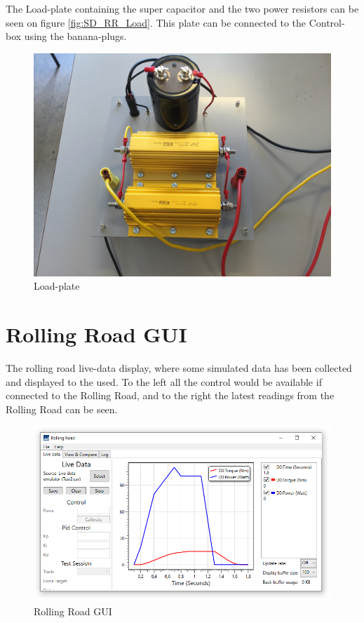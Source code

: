 The Load-plate containing the super capacitor and the two power resistors can be seen on figure \vref{fig:SD_RR_Load}. This plate can be connected to the Control-box using the banana-plugs.

\begin{figure}[H]
	\centering
	\includegraphics[width=0.7\linewidth]{SubPages/Images/SD_RR_Load}
	\caption{Load-plate}
	\label{fig:SD_RR_Load}
\end{figure}

\newpage
\section{Rolling Road GUI}
The rolling road live-data display, where some simulated data has been collected and displayed to the used. To the left all the control would be available if connected to the Rolling Road, and to the right the latest readings from the Rolling Road can be seen.

\begin{figure}[H]
	\centering
	\includegraphics[width=0.9\linewidth]{SubPages/Images/SD_GUI}
	\caption{Rolling Road GUI}
	\label{fig:SD_GUI}
\end{figure}
